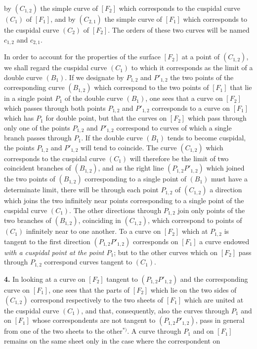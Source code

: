 \documentclass{article}
\begin{document}
by $(C_{1, 2})$ the simple curve of $[F_2]$ which corresponds to the cuspidal curve $(C_1)$ of $[F_1]$, and by $(C_{2, 1})$ the simple curve of $[F_1]$ which corresponds to the cuspidal curve $(C_2)$ of $[F_2]$. The orders of these two curves will be named $c_{1, 2}$ and $c_{2, 1}$.

In order to account for the properties of the surface $[F_2]$ at a point of $(C_{1, 2})$, we shall regard the cuspidal curve $(C_1)$ to which it corresponds as the limit of a double curve $(B_1)$. If we designate by $P_{1, 2}$ and $P'_{1, 2}$ the two points of the corresponding curve $(B_{1, 2})$ which correspond to the two points of $[F_1]$ that lie in a single point $P_1$ of the double curve $(B_1)$, one sees that a curve on $[F_2]$ which passes through both points $P_{1, 2}$ and $P'_{1, 2}$ corresponds to a curve on $[F_1]$ which has $P_1$ for double point, but that the curves on $[F_2]$ which pass through only one of the points $P_{1, 2}$ and $P'_{1, 2}$ correspond to curves of which a single branch passes through $P_1$. If the double curve $(B_1)$ tends to become cuspidal, the points $P_{1, 2}$ and $P'_{1, 2}$ will tend to coincide. The curve $(C_{1, 2})$ which corresponds to the cuspidal curve $(C_1)$ will therefore be the limit of two coincident branches of $(B_{1, 2})$, and as the right line $(P_{1, 2} P'_{1, 2})$ which joined the two points of $(B_{1, 2})$ corresponding to a single point of $(B_1)$ must have a determinate limit, there will be through each point $P_{1, 2}$ of $(C_{1, 2})$ a direction which joins the two infinitely near points corresponding to a single point of the cuspidal curve $(C_1)$. The other directions through $P_{1, 2}$ join only points of the two branches of $(B_{1, 2})$, coinciding in $(C_{1, 2})$, which correspond to points of $(C_1)$ infinitely near to one another. To a curve on $[F_2]$ which at $P_{1, 2}$ is tangent to the first direction $(P_{1, 2} P'_{1, 2})$ corresponds on $[F_1]$ a curve endowed \emph{with a cuspidal point at the point $P_1$}; but to the other curves which on $[F_2]$ pass through $P_{1, 2}$ correspond curves tangent to $(C_1)$.

\textbf{4.} In looking at a curve on $[F_2]$ tangent to $(P_{1, 2} P'_{1, 2})$ and the corresponding curve on $[F_1]$, one sees that the parts of $[F_2]$ which lie on the two sides of $(C_{1, 2})$ correspond respectively to the two sheets of $[F_1]$ which are united at the cuspidal curve $(C_1)$, and that, consequently, also the curves through $P_1$ and on $[F_1]$ whose correspondents are not tangent to $(P_{1, 2} P'_{1, 2})$, pass in general from one of the two sheets to the other${}^{*)}$. A curve through $P_1$ and on $[F_1]$ remains on the same sheet only in the case where the correspondent on
\end{document}
